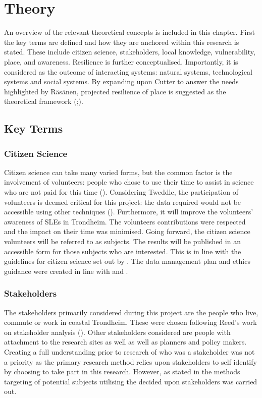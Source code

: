 
\chapter{Theory}


An overview of the relevant theoretical concepts is included in this chapter. First the key terms are defined and how they are anchored within this research is stated. These include citizen science, stakeholders, local knowledge, vulnerability, place, and awareness. Resilience is further conceptualised. Importantly, it is considered as the outcome of interacting systems: natural systems, technological systems and social systems. By expanding upon Cutter to answer the needs highlighted by Räsänen, projected resilience of place is suggested as the theoretical framework (\cite{cutter_place-based_2008};\cite{rasanen_conceptualizing_2020}).

\section{Key Terms}


\subsection{Citizen Science}
Citizen science can take many varied forms, but the common factor is the involvement of volunteers: people who chose to use their time to assist in science who are not paid for this time (\cite{pocock_choosing_2014}). Considering Tweddle, the participation of volunteers is deemed critical for this project: the data required would not be accessible using other techniques (\cite{tweddle_guide_2012}). Furthermore, it will improve the volunteers' awareness of SLEs in Trondheim.  The volunteers contributions were respected and the impact on their time was minimised. Going forward, the citizen science volunteers will be referred to as subjects. The results will be published in an accessible form for those subjects who are interested. This is in line with the guidelines for citizen science set out by \cite{tweddle_guide_2012}. The data management plan and ethics guidance were created in line with \cite{nesh_guidelines_2022} and \cite{nsd_norsk_nodate}. 

\subsection{Stakeholders}
The stakeholders primarily considered during this project are the people who live, commute or work in coastal Trondheim. These were chosen following Reed's work on stakeholder analysis (\cite{reed_stakeholder_nodate}). Other stakeholders considered are people with attachment to the research sites as well as well as planners and policy makers. Creating a full understanding prior to research of who was a stakeholder was not a priority as the primary research method relies upon stakeholders to self identify by choosing to take part in this research. However, as stated in the methods targeting of potential subjects utilising the decided upon stakeholders was carried out. 


